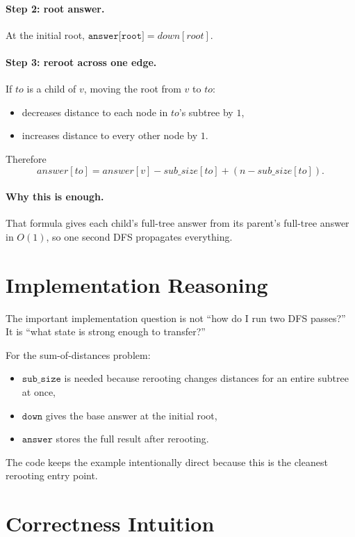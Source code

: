 \paragraph{Step 2: root answer.}
At the initial root, \(\texttt{answer[root]} = down[root]\).

\paragraph{Step 3: reroot across one edge.}
If \(to\) is a child of \(v\), moving the root from \(v\) to \(to\):

\begin{itemize}
  \item decreases distance to each node in \(to\)'s subtree by \(1\),
  \item increases distance to every other node by \(1\).
\end{itemize}

Therefore
\[
answer[to] = answer[v] - sub\_size[to] + (n - sub\_size[to]).
\]

\paragraph{Why this is enough.}
That formula gives each child's full-tree answer from its parent's full-tree answer in \(O(1)\), so one second DFS
propagates everything.

\section*{Implementation Reasoning}

The important implementation question is not ``how do I run two DFS passes?'' It is ``what state is strong enough to
transfer?''

For the sum-of-distances problem:

\begin{itemize}
  \item \(\texttt{sub\_size}\) is needed because rerooting changes distances for an entire subtree at once,
  \item \(\texttt{down}\) gives the base answer at the initial root,
  \item \(\texttt{answer}\) stores the full result after rerooting.
\end{itemize}

The code keeps the example intentionally direct because this is the cleanest rerooting entry point.

\section*{Correctness Intuition}

